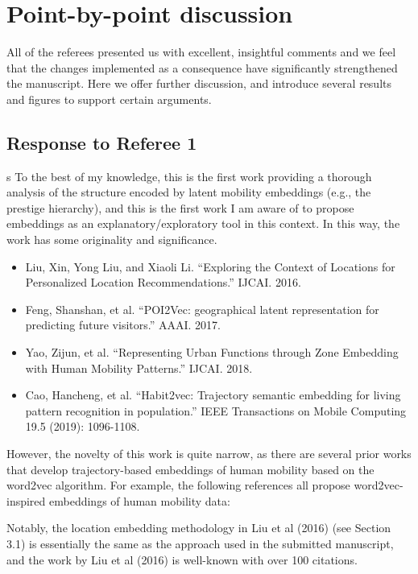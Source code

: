 \documentclass[12pt,a4paper]{article}
\newcommand{\rcomment}[1]{%
\vspace{10pt}
\begin{sectionbox}
s #1
\end{sectionbox}
}
\begin{document}
%
%
\clearpage
\section{Point-by-point discussion}
All of the referees presented us with excellent, insightful comments and we feel that the changes implemented as a consequence have signiﬁcantly strengthened the manuscript. Here we offer further discussion, and introduce several results and figures to support certain arguments.

\subsection{Response to Referee 1}

\rcomment{%
	To the best of my knowledge, this is the first work providing a thorough analysis of the structure encoded by latent mobility embeddings (e.g., the prestige hierarchy), and this is the first work I am aware of to propose embeddings as an explanatory/exploratory tool in this context. In this way, the work has some originality and significance.

	\begin{itemize}
		\item Liu, Xin, Yong Liu, and Xiaoli Li. ``Exploring the Context of Locations for Personalized Location Recommendations.'' IJCAI. 2016.
		\item Feng, Shanshan, et al. ``POI2Vec: geographical latent representation for predicting future visitors.'' AAAI. 2017.
		\item Yao, Zijun, et al. ``Representing Urban Functions through Zone Embedding with Human Mobility Patterns.'' IJCAI. 2018.
		\item Cao, Hancheng, et al. ``Habit2vec: Trajectory semantic embedding for living pattern recognition in population.'' IEEE Transactions on Mobile Computing 19.5 (2019): 1096-1108.
	\end{itemize}


	However, the novelty of this work is quite narrow, as there are several prior works that develop trajectory-based embeddings of human mobility based on the word2vec algorithm. For example, the following references all propose word2vec-inspired embeddings of human mobility data:


	Notably, the location embedding methodology in Liu et al (2016) (see Section 3.1) is essentially the same as the approach used in the submitted manuscript, and the work by Liu et al (2016) is well-known with over 100 citations.
}
\end{document}
